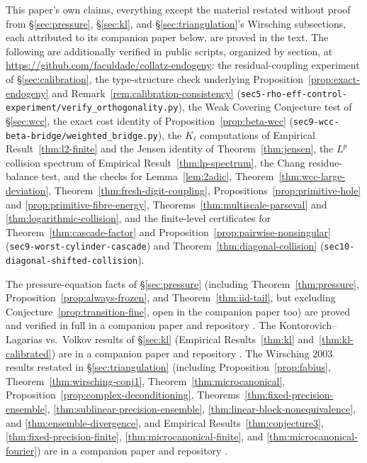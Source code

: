 \documentclass[11pt]{article}
\theoremstyle{definition}
\theoremstyle{remark}
\begin{document}
This paper's own claims, everything except the material restated
without proof from \S\ref{sec:pressure}, \S\ref{sec:kl}, and
\S\ref{sec:triangulation}'s Wirsching subsections, each attributed to
its companion paper below, are proved in the text. The following are
additionally verified in public scripts, organized by section, at
\url{https://github.com/faculdade/collatz-endogeny}: the
residual-coupling experiment of \S\ref{sec:calibration}, the
type-structure check underlying Proposition~\ref{prop:exact-endogeny}
and Remark~\ref{rem:calibration-consistency}
(\texttt{sec5-rho-eff-control-experiment/verify\_orthogonality.py}),
the Weak Covering Conjecture test of \S\ref{sec:wcc}, the exact cost
identity of Proposition~\ref{prop:beta-wcc}
(\texttt{sec9-wcc-beta-bridge/weighted\_bridge.py}), the
$K_\ell$ computations of Empirical Result~\ref{thm:l2-finite} and the
Jensen identity of Theorem~\ref{thm:jensen}, the $L^p$ collision
spectrum of Empirical Result~\ref{thm:lp-spectrum}, the Chang
residue-balance test, and the
checks for Lemma~\ref{lem:2adic}, Theorem~\ref{thm:wcc-large-deviation},
Theorem~\ref{thm:fresh-digit-coupling},
Propositions~\ref{prop:primitive-hole} and
\ref{prop:primitive-fibre-energy},
Theorems~\ref{thm:multiscale-parseval} and
\ref{thm:logarithmic-collision}, and the finite-level certificates for
Theorem~\ref{thm:cascade-factor} and
Proposition~\ref{prop:pairwise-nonsingular}
(\texttt{sec9-worst-cylinder-cascade}) and Theorem~\ref{thm:diagonal-collision}
(\texttt{sec10-diagonal-shifted-collision}).

The pressure-equation facts of \S\ref{sec:pressure} (including
Theorem~\ref{thm:pressure}, Proposition~\ref{prop:always-frozen}, and
Theorem~\ref{thm:iid-tail}, but excluding
Conjecture~\ref{prop:transition-fine}, open in the companion paper
too) are proved and verified in full in a
companion paper and repository \cite{PressureCompanion}. The
Kontorovich--Lagarias vs.\ Volkov results of \S\ref{sec:kl}
(Empirical Results~\ref{thm:kl} and~\ref{thm:kl-calibrated}) are in a
companion paper and repository \cite{KLVolkovCompanion}. The Wirsching
2003 results restated in \S\ref{sec:triangulation} (including
Proposition~\ref{prop:fabius}, Theorem~\ref{thm:wirsching-conj1},
Theorem~\ref{thm:microcanonical},
Proposition~\ref{prop:complex-deconditioning},
Theorems~\ref{thm:fixed-precision-ensemble},
\ref{thm:sublinear-precision-ensemble},
\ref{thm:linear-block-nonequivalence}, and
\ref{thm:ensemble-divergence}, and Empirical
Results~\ref{thm:conjecture3}, \ref{thm:fixed-precision-finite},
\ref{thm:microcanonical-finite}, and \ref{thm:microcanonical-fourier})
are in a companion paper and repository \cite{WirschingCompanion}.
\end{document}
